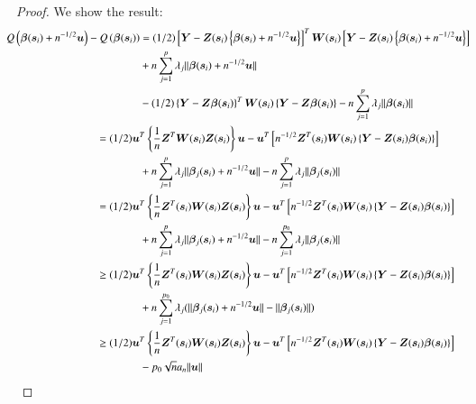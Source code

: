 \documentclass[authoryear, review, 11pt]{elsarticle}
\begin{document}
\begin{proof}
    We show the result:
    \begin{align}\label{eq:consistency}
      \mkern-18mu Q \left( \bm{\beta} (\bm{s}_i) + n^{-1/2} \bm{u} \right) - Q \left( \bm{\beta}(\bm{s}_i) \right) &= (1/2) \left[ \bm{Y} - \bm{Z}(\bm{s}_i) \left\{ \bm{\beta}(\bm{s}_i) + n^{-1/2} \bm{u} \right\} \right]^T \bm{W}(\bm{s}_i) \left[ \bm{Y} - \bm{Z}(\bm{s}_i) \left\{ \bm{\beta}(\bm{s}_i) + n^{-1/2} \bm{u} \right\} \right] \notag \\
      &+ n \sum_{j=1}^p \lambda_j \| \bm{\beta}(\bm{s}_i) + n^{-1/2} \bm{u} \| \notag \\
      &- (1/2) \left\{ \bm{Y} - \bm{Z} \bm{\beta}(\bm{s}_i) \right\}^T \bm{W}(\bm{s}_i) \left\{ \bm{Y} - \bm{Z} \bm{\beta}(\bm{s}_i) \right\} - n \sum_{j=1}^p \lambda_j \| \bm{\beta}(\bm{s}_i) \| \notag \\ 
      &\mkern-72mu= (1/2) \bm{u}^T \left\{ \frac{1}{n} \bm{Z}^T \bm{W}(\bm{s}_i) \bm{Z}(\bm{s}_i) \right\} \bm{u} - \bm{u}^T \left[ n^{-1/2} \bm{Z}^T(\bm{s}_i) \bm{W}(\bm{s}_i) \left\{ \bm{Y} - \bm{Z}(\bm{s}_i) \bm{\beta}(\bm{s}_i) \right\} \right] \notag \\
      &+ n \sum_{j=1}^p \lambda_j \|\bm{\beta}_j(\bm{s}_i) + n^{-1/2} \bm{u} \| - n \sum_{j=1}^p \lambda_j \| \bm{\beta}_j(\bm{s}_i) \| \notag \\
      &\mkern-72mu= (1/2) \bm{u}^T \left\{ \frac{1}{n} \bm{Z}^T(\bm{s}_i) \bm{W}(\bm{s}_i) \bm{Z}(\bm{s}_i) \right\} \bm{u} - \bm{u}^T \left[ n^{-1/2} \bm{Z}^T(\bm{s}_i) \bm{W}(\bm{s}_i) \left\{ \bm{Y} - \bm{Z}(\bm{s}_i) \bm{\beta}(\bm{s}_i) \right\} \right] \notag \\
      &+ n \sum_{j=1}^p \lambda_j \|\bm{\beta}_j(\bm{s}_i) + n^{-1/2} \bm{u} \| - n \sum_{j=1}^{p_0} \lambda_j \| \bm{\beta}_j(\bm{s}_i) \| \notag \\
      &\mkern-72mu\ge (1/2) \bm{u}^T \left\{ \frac{1}{n} \bm{Z}^T(\bm{s}_i) \bm{W}(\bm{s}_i) \bm{Z}(\bm{s}_i) \right\} \bm{u} - \bm{u}^T \left[ n^{-1/2} \bm{Z}^T(\bm{s}_i) \bm{W}(\bm{s}_i) \left\{ \bm{Y} - \bm{Z}(\bm{s}_i) \bm{\beta}(\bm{s}_i) \right\} \right] \notag \\
      &+ n \sum_{j=1}^{p_0} \lambda_j ( \|\bm{\beta}_j(\bm{s}_i) + n^{-1/2} \bm{u} \| - \| \bm{\beta}_j(\bm{s}_i) \| ) \notag \\
      &\mkern-72mu\ge (1/2) \bm{u}^T \left\{ \frac{1}{n} \bm{Z}^T(\bm{s}_i) \bm{W}(\bm{s}_i) \bm{Z}(\bm{s}_i) \right\} \bm{u} - \bm{u}^T \left[ n^{-1/2} \bm{Z}^T(\bm{s}_i) \bm{W}(\bm{s}_i) \left\{ \bm{Y} - \bm{Z}(\bm{s}_i) \bm{\beta}(\bm{s}_i) \right\} \right] \notag \\
      &- p_0 \sqrt{n} a_n \| \bm{u} \|
    \end{align}
  \end{proof}
\end{document}
